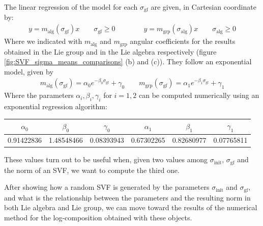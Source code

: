 The linear regression of the model for each $\sigma_{\text{gf}}$ are given, in Cartesian coordinate by:
\begin{align}\label{eq:angular_coefficients_for_the_gf}
y = m_{\text{alg}}( \sigma_{\text{gf}} )x \qquad  \sigma_{\text{gf}} \geq 0
\qquad
\qquad
y = m_{\text{grp}}( \sigma_{\text{alg}} )x \qquad  \sigma_{\text{alg}} \ge 0
\end{align}
Where we indicated with $m_{\text{alg}}$ and $m_{\text{grp}}$ angular coefficients for the results obtained in the Lie group and in the Lie algebra respectively (figure \ref{fig:SVF_sigma_means_comparisons} (b) and (c)). They follow an exponential model, given by
\begin{align}
m_{\text{alg}}( \sigma_{\text{gf}} )
=
\alpha_0 e^{-\beta_0 \sigma_{\text{gf}}} + \gamma_0 
\qquad
m_{\text{grp}}( \sigma_{\text{gf}} )
=
\alpha_1 e^{-\beta_1 \sigma_{\text{gf}}} + \gamma_1
\end{align}
Where the parameters $\alpha_i, \beta_i, \gamma_i$ for $i=1,2$ can be computed numerically using an exponential regression algorithm:
\begin{center}
	\begin{tabular}{ c | c |c |c |c |c}
	$\alpha_0$ & $\beta_0$ & $\gamma_0$ & $\alpha_1$ & $ \beta_1$ & $\gamma_1$ \\
	\hline
	0.91422836 &  1.48548466 &  0.08393943 &  0.67302265 &  0.82680977 &  0.07765811
	\end{tabular}
\end{center}

These values turn out to be useful when, given two values among $\sigma_{\text{init}}$, $\sigma_{\text{gf}}$ and the norm of an SVF, we want to compute the third one.

After showing how a random SVF is generated by the parameters $\sigma_{\text{init}}$ and $\sigma_{\text{gf}}$, and what is the relationship between the parameters and the resulting norm in both Lie algebra and Lie group, we can move toward the results of the numerical method for the log-composition obtained with these objects.

